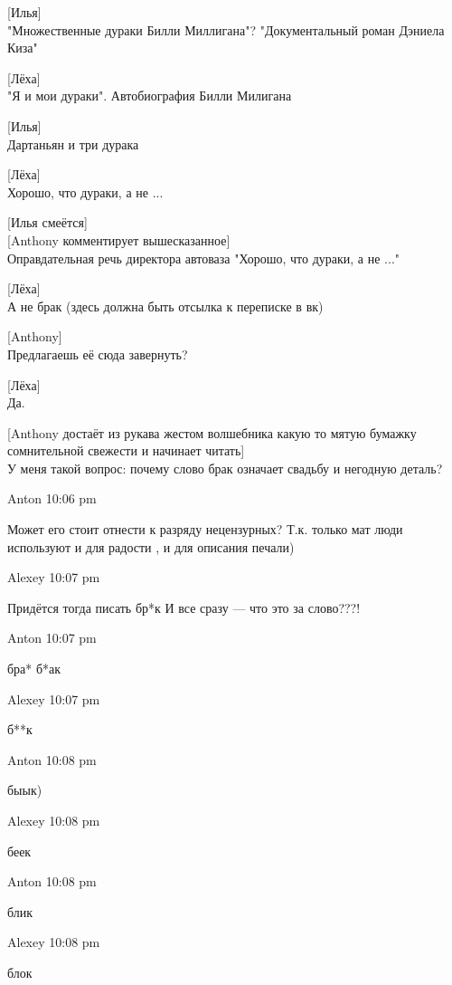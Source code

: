 [Илья]\\
"Множественные дураки Билли Миллигана"?
"Документальный роман Дэниела Киза"


[Лёха]\\
"Я и мои дураки". Автобиография Билли Милигана


[Илья]\\
Дартаньян и три дурака


[Лёха]\\
Хорошо, что дураки, а не ...


[Илья смеётся]\\


[Anthony комментирует вышесказанное]\\
Оправдательная речь директора автоваза
"Хорошо, что дураки, а не ..."


[Лёха]\\
А не брак (здесь должна быть отсылка к переписке в вк) %


[Anthony]\\
Предлагаешь её сюда завернуть?


[Лёха]\\
Да.


[Anthony достаёт из рукава жестом волшебника какую то мятую бумажку сомнительной свежести и начинает читать]\\
У меня такой вопрос: почему слово брак означает свадьбу и негодную деталь?

Anton 10:06 pm %

    Может его стоит отнести к разряду нецензурных? Т.к. только мат люди используют и для радости , и для описания печали)

Alexey 10:07 pm

    Придётся тогда писать бр*к
    И все сразу — что это за слово???!

Anton 10:07 pm

    бра*
    б*ак

Alexey 10:07 pm

    б**к

Anton 10:08 pm

    быык)

Alexey 10:08 pm

    беек

Anton 10:08 pm

    блик

Alexey 10:08 pm

    блок

